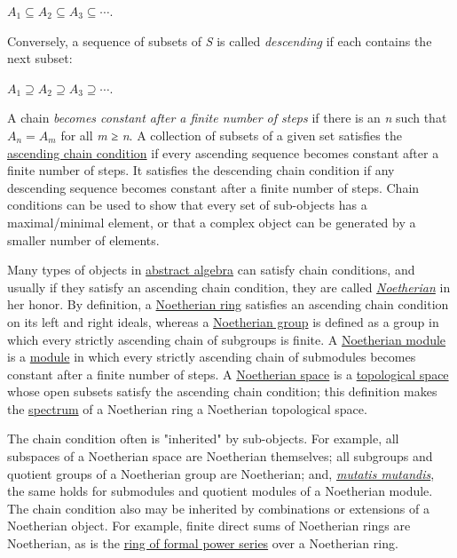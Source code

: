 {{\(A_{1} \subseteq A_{2} \subseteq A_{3} \subseteq \cdots.\)}{}}

Conversely, a sequence of subsets of {\emph{S}} is called \emph{descending} if each contains the next subset:

{{\(A_{1} \supseteq A_{2} \supseteq A_{3} \supseteq \cdots.\)}{}}

A chain \emph{becomes constant after a finite number of steps} if there is an {\emph{n}} such that {{\(A_{n} = A_{m}\)}{}} for all {\emph{m} ≥ \emph{n}}. A collection of subsets of a given set satisfies the \href{https://en.wikipedia.org/wiki/Ascending_chain_condition}{ascending chain condition} if every ascending sequence becomes constant after a finite number of steps. It satisfies the descending chain condition if any descending sequence becomes constant after a finite number of steps. Chain conditions can be used to show that every set of sub-objects has a maximal/minimal element, or that a complex object can be generated by a smaller number of elements.

Many types of objects in \href{https://en.wikipedia.org/wiki/Abstract_algebra}{abstract algebra} can satisfy chain conditions, and usually if they satisfy an ascending chain condition, they are called \emph{\href{https://en.wikipedia.org/wiki/Noetherian_(disambiguation)}{Noetherian}} in her honor. By definition, a \href{https://en.wikipedia.org/wiki/Noetherian_ring}{Noetherian ring} satisfies an ascending chain condition on its left and right ideals, whereas a \href{https://en.wikipedia.org/wiki/Noetherian_group}{Noetherian group} is defined as a group in which every strictly ascending chain of subgroups is finite. A \href{https://en.wikipedia.org/wiki/Noetherian_module}{Noetherian module} is a \href{https://en.wikipedia.org/wiki/Module_(mathematics)}{module} in which every strictly ascending chain of submodules becomes constant after a finite number of steps. A \href{https://en.wikipedia.org/wiki/Noetherian_space}{Noetherian space} is a \href{https://en.wikipedia.org/wiki/Topological_space}{topological space} whose open subsets satisfy the ascending chain condition; this definition makes the \href{https://en.wikipedia.org/wiki/Spectrum_of_a_ring}{spectrum} of a Noetherian ring a Noetherian topological space.

The chain condition often is "inherited" by sub-objects. For example, all subspaces of a Noetherian space are Noetherian themselves; all subgroups and quotient groups of a Noetherian group are Noetherian; and, \emph{\href{https://en.wikipedia.org/wiki/Mutatis_mutandis}{mutatis mutandis}}, the same holds for submodules and quotient modules of a Noetherian module. The chain condition also may be inherited by combinations or extensions of a Noetherian object. For example, finite direct sums of Noetherian rings are Noetherian, as is the \href{https://en.wikipedia.org/wiki/Ring_of_formal_power_series}{ring of formal power series} over a Noetherian ring.

